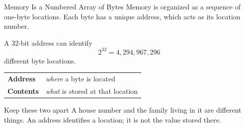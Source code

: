 \documentclass[9pt,aspectratio=169,xcolor=table]{beamer}
\begin{document}
\begin{frame}{Memory Is a Numbered Array of Bytes}
	\leavevmode
	Memory is organized as a sequence of one-byte locations. Each byte has
	a unique \alert{address}, which acts as its location number.

	\vspace{3mm}
	A 32-bit address can identify
	\[
	2^{32} = 4{,}294{,}967{,}296
	\]
	different byte locations.

	\vspace{2mm}
	\begin{center}
		{\small
			\begin{tabular}{@{}ll@{}}
				\textbf{Address}   & \emph{where} a byte is located \\[1mm]
				\textbf{Contents}  & \emph{what} is stored at that location
		\end{tabular}}
	\end{center}

	\vspace{3mm}
	\begin{block}{Keep these two apart}
		A house number and the family living in it are different things.
		An address identifies a location; it is not the value stored there.
	\end{block}
\end{frame}
\end{document}
